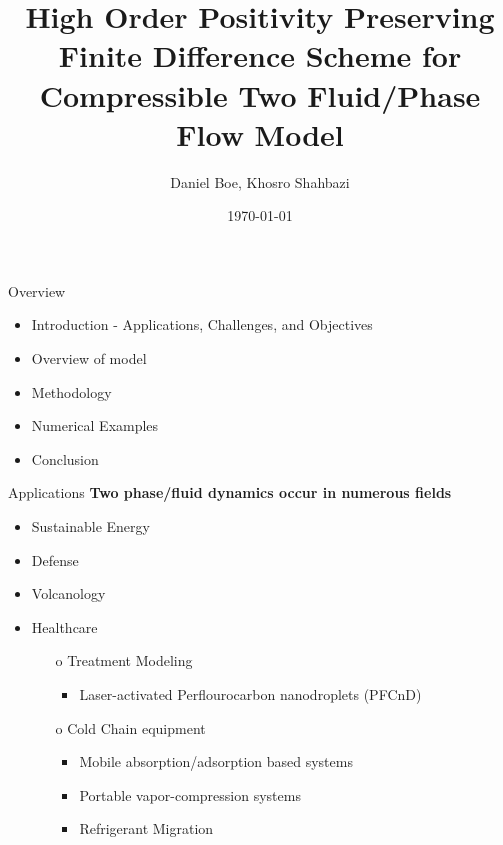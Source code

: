 \documentclass[10pt]{beamer}
\title{High Order Positivity Preserving Finite Difference Scheme for Compressible Two Fluid/Phase Flow Model}
\date{\today}
\author{Daniel Boe, Khosro Shahbazi}
\institute{South Dakota School of Mines and Technology}
\begin{document}
\maketitle

\begin{frame}{Overview}
  \begin{itemize}
  \item Introduction - Applications, Challenges, and Objectives
  \item Overview of model
  \item Methodology
  \item Numerical Examples
  \item Conclusion
  \end{itemize}
  \end{frame}

  \begin{frame}{Applications}
    \textbf{Two phase/fluid dynamics occur in numerous fields}
    \begin{itemize}
      \item Sustainable Energy
      \item Defense
      \item Volcanology
      \item Healthcare
      \begin{itemize}
        \item[o] Treatment Modeling
        \begin{itemize}
          \item Laser-activated Perflourocarbon nanodroplets (PFCnD)
        \end{itemize} 
        \item[o] Cold Chain equipment
        \begin{itemize}
          \item Mobile absorption/adsorption based systems
          \item Portable vapor-compression systems
          \item Refrigerant Migration
        \end{itemize} 
      \end{itemize} 
    \end{itemize}
  \end{frame}
\end{document}
